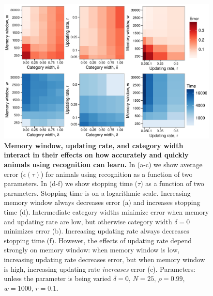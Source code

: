 \begin{figure}[ht]
\includegraphics[width=6.85in]{figures/parameters_interactions_full.pdf}
\caption{\sffamily\small\textbf{Memory window, updating rate, and category width interact in their effects on how accurately and quickly animals using recognition can learn.}
In (a-c) we show average error ($\epsilon(\tau)$) for animals using recognition as a function of two parameters. In (d-f) we show stopping time ($\tau$) as a function of two parameters. Stopping time is on a logarithmic scale. Increasing memory window always decreases error (a) and increases stopping time (d). Intermediate category widths minimize error when memory and updating rate are low, but otherwise category width $\delta=0$ minimizes error (b). Increasing updating rate always decreases stopping time (f). However, the effects of updating rate depend strongly on memory window: when memory window is low, increasing updating rate decreases error, but when memory window is high, increasing updating rate \emph{increases} error (c). Parameters: unless the parameter is being varied $\delta = 0$, $N=25$, $\rho=0.99$, $w=1000$, $r=0.1$.}
\label{interactions}
\end{figure}

